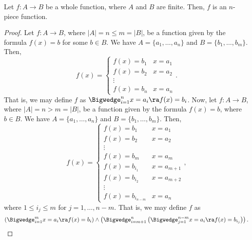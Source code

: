\documentclass[12pt]{article}
\begin{document}
    \begin{theorem}
        Let $f:A \to B$ be a whole function, where $A$ and $B$ are finite. Then, $f$ is an $n$-piece function.  
    \end{theorem}
    \begin{proof}
        Let $f:A \to B$, where $|A| = n \le m = |B|$, be a function given by the formula $f(x) = b$ for some $b \in B$. We have $A = \{a_1,\dots,a_n\}$ and $B = \{b_1,\dots,b_m\}$. Then, 
        \[
            f(x) = 
            \begin{cases}
                f(x) = b_1 & x = a_1 \\
                f(x) = b_2 & x = a_2 \\
                \vdots \\
                f(x) = b_n & x = a_n
            \end{cases}. 
        \]
        That is, we may define $f$ as $\Bigwedge_{i = 1}^n x = a_i \ra f(x) = b_i$. \p
        Now, let $f:A \to B$, where $|A| = n > m = |B|$, be a function given by the formula $f(x) = b$, where $b \in B$. We have $A = \{a_1,\dots,a_n\}$ and $B = \{b_1,\dots,b_m\}$. Then, 
        \[
            f(x) = 
            \begin{cases}
                f(x) = b_1 & x = a_1 \\
                f(x) = b_2 & x = a_2 \\
                \vdots \\
                f(x) = b_m & x = a_m \\
                f(x) = b_{i_1} & x = a_{m + 1} \\
                f(x) = b_{i_2} & x = a_{m + 2} \\
                \vdots \\
                f(x) = b_{i_{n - m}} & x = a_n
            \end{cases}, 
        \]
        where $1 \le i_j \le m$ for $j = 1,\dots,n - m$. That is, we may define $f$ as 
        \[
            \left(\Bigwedge_{i = 1}^m x = a_i \ra f(x) = b_i\right) \land 
            \left(
                \Bigwedge_{i = m + 1}^n
                \left(
                    \Bigwedge_{j = 1}^{n - m} x = a_i \ra f(x) = b_{i_j}
                \right)
            \right). 
        \]


\end{proof}
\end{document}
